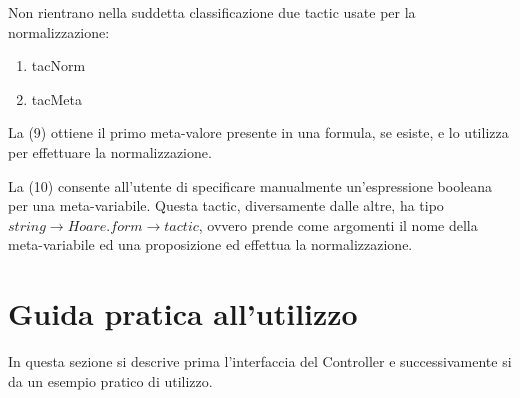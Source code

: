 \documentclass[]{article}
\begin{document}
\par
Non rientrano nella suddetta classificazione due tactic usate per la normalizzazione:
\begin{enumerate}
	\setcounter{enumi}{\theenumTemp}
	\item tacNorm
	\item tacMeta 
\end{enumerate}
\par
La (9) ottiene il primo meta-valore presente in una formula, se esiste, e lo utilizza per effettuare la normalizzazione.
\par
La (10) consente all'utente di specificare manualmente un'espressione booleana per una meta-variabile. Questa tactic, diversamente dalle altre, ha tipo $string \rightarrow Hoare.form \rightarrow tactic$, ovvero prende come argomenti il nome della meta-variabile ed una proposizione ed effettua la normalizzazione.

\section{Guida pratica all'utilizzo}
In questa sezione si descrive prima l'interfaccia del Controller e successivamente si da un esempio pratico di utilizzo.
\end{document}
